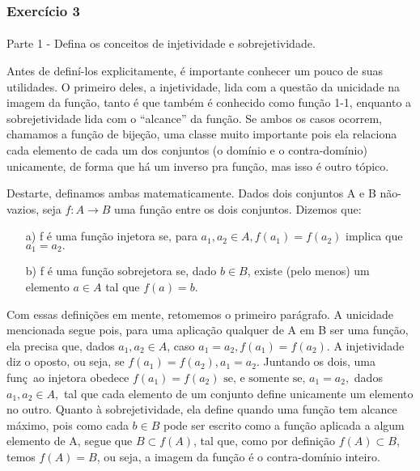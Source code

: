 \documentclass[Calculus1/exercícios_de_cálculo.tex]{subfiles}
\begin{document}
\subsubsection{Exercício 3}
\paragraph{}Parte 1  - Defina os conceitos de injetividade e sobrejetividade.
\begin{sol*}
	Antes de definí-los explicitamente, é importante conhecer um pouco de suas utilidades. O primeiro deles, a injetividade, lida com a questão da unicidade na imagem da função, tanto é que também é conhecido como funç\~ao 1-1, enquanto a sobrejetividade lida com o ``alcance'' da funç\~ao. Se ambos os casos ocorrem, chamamos a funç\~ao de bijeç\~ao, uma classe muito importante pois ela relaciona cada elemento de cada um dos conjuntos (o dom\'inio e o contra-dom\'inio) unicamente, de forma que há um inverso pra funç\~ao, mas isso é outro tópico.

	Destarte, definamos ambas matematicamente. Dados dois conjuntos A e B não-vazios, seja $f:A\rightarrow{B}$ uma função entre os dois conjuntos. Dizemos que:
	\begin{itemize}
		\item[a)] f é uma função injetora se, para $a_1, a_2\in{A}, f(a_1) = f(a_2)$ implica que $a_1 =  a_2.$
		\item[b)] f é uma função sobrejetora se, dado $b\in{B}$, existe (pelo menos) um elemento $a\in{A}$ tal que $f(a) = b.$
	\end{itemize}

	Com essas definições em mente, retomemos o primeiro parágrafo. A unicidade mencionada segue pois, para uma aplicação qualquer de A em B ser uma função, ela precisa que, dados $a_1, a_2\in{A}$, caso $a_1 = a_2, f(a_1) = f(a_2)$. A injetividade diz o oposto, ou seja, se $f(a_1) = f(a_2), a_1 = a_2$. Juntando os dois, uma funç~ao injetora obedece $f(a_1) = f(a_2) \text{ se, e somente se, } a_1 = a_2,$ dados $a_1, a_2\in{A},$ tal que cada elemento de um conjunto define unicamente um elemento no outro. Quanto à sobrejetividade, ela define quando uma funç\~ao tem alcance máximo, pois como cada $b\in{B}$ pode ser escrito como a funç\~ao aplicada a algum elemento de A, segue que $B \subset f(A)$, tal que, como por definiç\~ao $f(A) \subset B$, temos $f(A) = B$, ou seja, a imagem da funç\~ao é o contra-domínio inteiro.
	\qedsymbol
\end{sol*}
\end{document}
